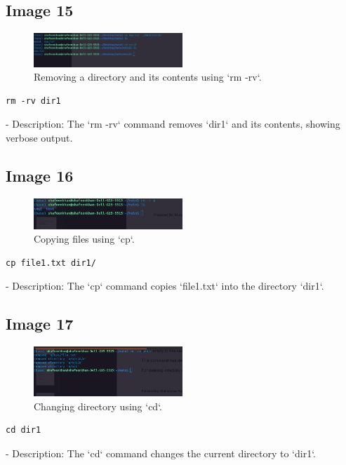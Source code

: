 \documentclass[12pt]{article}
\begin{document}
\subsection*{Image 15}
\begin{figure}[h!]
    \centering
    \includegraphics[width=0.5\textwidth]{15.png}
    \caption{Removing a directory and its contents using `rm -rv`.}
\end{figure}
\begin{lstlisting}
rm -rv dir1
\end{lstlisting}
- Description: The `rm -rv` command removes `dir1` and its contents, showing verbose output.

\subsection*{Image 16}
\begin{figure}[h!]
    \centering
    \includegraphics[width=0.5\textwidth]{16.png}
    \caption{Copying files using `cp`.}
\end{figure}
\begin{lstlisting}
cp file1.txt dir1/
\end{lstlisting}
- Description: The `cp` command copies `file1.txt` into the directory `dir1`.

\subsection*{Image 17}
\begin{figure}[h!]
    \centering
    \includegraphics[width=0.5\textwidth]{17.png}
    \caption{Changing directory using `cd`.}
\end{figure}
\begin{lstlisting}
cd dir1
\end{lstlisting}
- Description: The `cd` command changes the current directory to `dir1`.
\end{document}
